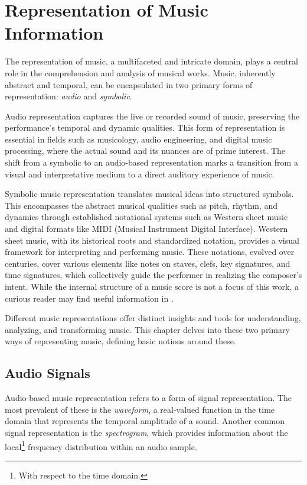 \chapter{Representation of Music Information}\label{representation_of_music_information}

The representation of music, a multifaceted and intricate domain, plays a central role in the comprehension and analysis of musical works. Music, inherently abstract and temporal, can be encapsulated in two primary forms of representation: \emph{audio} and \emph{symbolic}.

Audio representation captures the live or recorded sound of music, preserving the performance's temporal and dynamic qualities. This form of representation is essential in fields such as musicology, audio engineering, and digital music processing, where the actual sound and its nuances are of prime interest. The shift from a symbolic to an audio-based representation marks a transition from a visual and interpretative medium to a direct auditory experience of music.

Symbolic music representation translates musical ideas into structured symbols. This encompasses the abstract musical qualities such as pitch, rhythm, and dynamics through established notational systems such as Western sheet music and digital formats like MIDI (Musical Instrument Digital Interface). Western sheet music, with its historical roots and standardized notation, provides a visual framework for interpreting and performing music. These notations, evolved over centuries, cover various elements like notes on staves, clefs, key signatures, and time signatures, which collectively guide the performer in realizing the composer's intent. While the internal structure of a music score is not a focus of this work, a curious reader may find useful information in \cite{Read1969}.

Different music representations offer distinct insights and tools for understanding, analyzing, and transforming music. This chapter delves into these two primary ways of representing music, defining basic notions around these.

\section{Audio Signals}

Audio-based music representation refers to a form of signal representation. The most prevalent of these is the \emph{waveform}, a real-valued function in the time domain that represents the temporal amplitude of a sound. Another common signal representation is the \emph{spectrogram}, which provides information about the local\footnote{With respect to the time domain.} frequency distribution within an audio sample.

